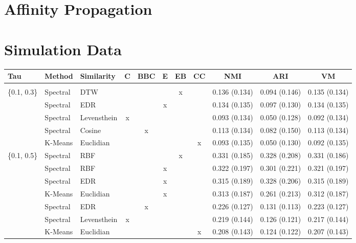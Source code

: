 \documentclass[12pt,a4paper,bibliography=totocnumbered,listof=totocnumbered]{scrartcl}
\begin{document}
\begin{appendix}
\section{Affinity Propagation}

\cite{Brusco2008}

\pagebreak
\section{Simulation Data}

\begin{table}[!htbp] \centering 
	\label{} 
	\scriptsize
		\begin{tabularx}{\textwidth}{ lllcccccccc} \\
			\toprule
			Tau & Method & Similarity & C & BBC & E & EB & CC & NMI & ARI & VM \\ 
			\hline \\[-1.8ex] 
		\{0.1, 0.3\} & Spectral & DTW &  &  &  & x &  & 0.136 (0.134) & 0.094 (0.146) & 0.135 (0.134) \\ 
		& Spectral & EDR &  &  & x &  &  & 0.134 (0.135) & 0.097 (0.130) & 0.134 (0.135) \\ 
		& Spectral & Levensthein & x &  &  &  &  & 0.093 (0.134) & 0.050 (0.128) & 0.092 (0.134) \\ 
		& Spectral & Cosine &  & x &  &  &  & 0.113 (0.134) & 0.082 (0.150) & 0.113 (0.134) \\ 
		& K-Means & Euclidian &  &  &  &  & x & 0.093 (0.135) & 0.050 (0.130) & 0.092 (0.135) \\ 
		\{0.1, 0.5\} & Spectral & RBF &  &  &  & x &  & 0.331 (0.185) & 0.328 (0.208) & 0.331 (0.186) \\ 
		& Spectral & RBF &  &  & x &  &  & 0.322 (0.197) & 0.301 (0.221) & 0.321 (0.197) \\ 
		& Spectral & EDR &  &  & x &  &  & 0.315 (0.189) & 0.328 (0.206) & 0.315 (0.189) \\ 
		& K-Means & Euclidian &  &  & x &  &  & 0.313 (0.187) & 0.261 (0.213) & 0.312 (0.187) \\ 
		& Spectral & EDR &  & x &  &  &  & 0.226 (0.127) & 0.131 (0.113) & 0.223 (0.127) \\ 
		& Spectral & Levensthein & x &  &  &  &  & 0.219 (0.144) & 0.126 (0.121) & 0.217 (0.144) \\ 
		& K-Means & Euclidian &  &  &  &  & x & 0.208 (0.143) & 0.124 (0.122) & 0.207 (0.143) \\ 

\end{tabularx}
\end{table}
\end{appendix}
\end{document}
